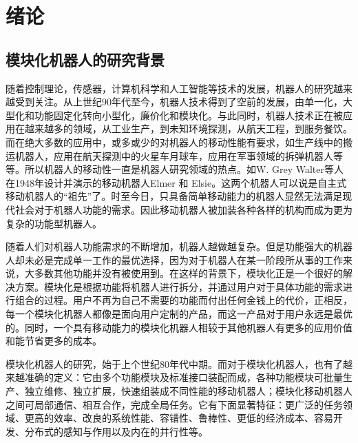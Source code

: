 
\chapter{绪论}
\label{chap:introduction}

\section{模块化机器人的研究背景}

随着控制理论，传感器，计算机科学和人工智能等技术的发展，机器人的研究越来越受到关注。从上世纪90年代至今，机器人技术得到了空前的发展，由单一化，大型化和功能固定化转向小型化，廉价化和模块化。与此同时，机器人技术正在被应用在越来越多的领域，从工业生产，到未知环境探测，从航天工程，到服务餐饮。而在绝大多数的应用中，或多或少的对机器人的移动性能有要求，如生产线中的搬运机器人，应用在航天探测中的火星车月球车，应用在军事领域的拆弹机器人等等。所以机器人的移动性一直是机器人研究领域的热点。如W. Grey Walter等人在1948年设计并演示的移动机器人Elmer 和 Elsie。这两个机器人可以说是自主式移动机器人的“祖先”了。时至今日，只具备简单移动能力的机器人显然无法满足现代社会对于机器人功能的需求。因此移动机器人被加装各种各样的机构而成为更为复杂的功能型机器人。

随着人们对机器人功能需求的不断增加，机器人越做越复杂。但是功能强大的机器人却未必是完成单一工作的最优选择，因为对于机器人在某一阶段所从事的工作来说，大多数其他功能并没有被使用到。在这样的背景下，模块化正是一个很好的解决方案。模块化是根据功能将机器人进行拆分，并通过用户对于具体功能的需求进行组合的过程。用户不再为自己不需要的功能而付出任何金钱上的代价，正相反，每一个模块化机器人都像是面向用户定制的产品，而这一产品对于用户永远是最优的。同时，一个具有移动能力的模块化机器人相较于其他机器人有更多的应用价值和能节省更多的成本。 

模块化机器人的研究，始于上个世纪80年代中期。而对于模块化机器人，也有了越来越准确的定义：它由多个功能模块及标准接口装配而成，各种功能模块可批量生产、独立维修、独立扩展，快速组装成不同性能的移动机器人；模块化移动机器人之间可局部通信、相互合作，完成全局任务。它有下面显著特征：更广泛的任务领域、更高的效率、改良的系统性能、容错性、鲁棒性、更低的经济成本、容易开发、分布式的感知与作用以及内在的并行性等。 


